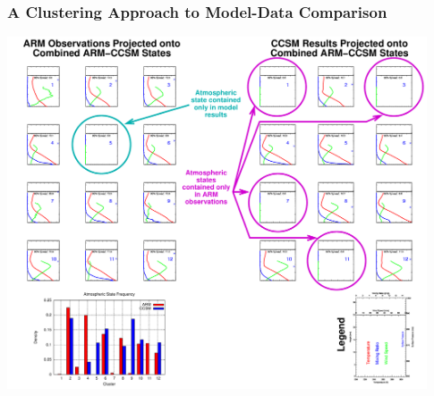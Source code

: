 \begin{frame}
 \frametitle{A Clustering Approach to Model-Data Comparison}
 \footnotesize
 \vbox{\centering
  \includegraphics[width=0.93\textwidth]{arm_figure/highlight_figure.pdf}
 }
 \vskip-0.30in
 \hspace*{1.75in}{(Mahajan et al., in prep.)}
\end{frame}
